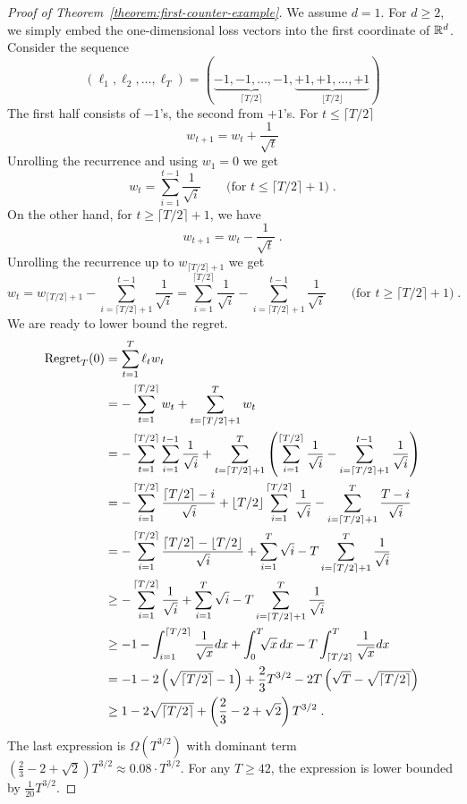 \begin{proof}[Proof of Theorem~\ref{theorem:first-counter-example}]
We assume $d=1$. For $d \ge 2$, we simply embed the one-dimensional loss
vectors into the first coordinate of $\mathbb{R}^d$.  Consider the sequence
$$
(\ell_1, \ell_2, \dots, \ell_T) = \left( \underbrace{- 1, -1, \dots, -1}_{\lceil T/2 \rceil}, \underbrace{+1, +1, \dots, +1}_{\lfloor T/2 \rfloor} \right)
$$
The first half consists of $-1$'s, the second from $+1$'s. For $t \le \lceil T/2 \rceil$
$$
w_{t+1} = w_t + \frac{1}{\sqrt{t}}
$$
Unrolling the recurrence and using $w_1 = 0$ we get
$$
w_t = \sum_{i=1}^{t-1} \frac{1}{\sqrt{i}} \qquad \text{(for $t \le \lceil T/2 \rceil + 1$)} \; .
$$
On the other hand, for $t \ge \lceil T/2 \rceil + 1$, we have
$$
w_{t+1} = w_t - \frac{1}{\sqrt{t}} \; .
$$
Unrolling the recurrence up to $w_{\lceil T/2 \rceil + 1}$ we get
$$
w_t = w_{\lceil T/2 \rceil + 1} - \sum_{i=\lceil T/2 \rceil + 1}^{t-1} \frac{1}{\sqrt{i}}
= \sum_{i=1}^{\lceil T/2 \rceil} \frac{1}{\sqrt{i}} - \sum_{i=\lceil T/2 \rceil + 1}^{t-1} \frac{1}{\sqrt{i}} \qquad \text{(for $t \ge \lceil T/2 \rceil + 1$)} \; .
$$
We are ready to lower bound the regret.
\begin{align*}
\operatorname{Regret}_T(0)
& = \sum_{t=1}^T \ell_t w_t \\
& = - \sum_{t=1}^{\lceil T/2 \rceil} w_t + \sum_{t=\lceil T/2 \rceil + 1}^T w_t  \\
& = - \sum_{t=1}^{\lceil T/2 \rceil} \sum_{i=1}^{t-1} \frac{1}{\sqrt{i}} + \sum_{t=\lceil T/2 \rceil + 1}^T \left( \sum_{i=1}^{\lceil T/2 \rceil} \frac{1}{\sqrt{i}} - \sum_{i=\lceil T/2 \rceil + 1}^{t-1} \frac{1}{\sqrt{i}} \right) \\
& = - \sum_{i=1}^{\lceil T/2 \rceil} \frac{\lceil T/2 \rceil - i}{\sqrt{i}} + \lfloor T/2 \rfloor \sum_{i=1}^{\lceil T/2 \rceil} \frac{1}{\sqrt{i}} - \sum_{i=\lceil T/2 \rceil + 1}^T \frac{T - i}{\sqrt{i}} \\
& = - \sum_{i=1}^{\lceil T/2 \rceil} \frac{\lceil T/2 \rceil - \lfloor T/2 \rfloor}{\sqrt{i}} + \sum_{i=1}^{T} \sqrt{i} - T \sum_{i=\lceil T/2 \rceil + 1}^T \frac{1}{\sqrt{i}} \\
& \ge - \sum_{i=1}^{\lceil T/2 \rceil} \frac{1}{\sqrt{i}} + \sum_{i=1}^{T} \sqrt{i} - T \sum_{i=\lceil T/2 \rceil + 1}^T \frac{1}{\sqrt{i}} \\
& \ge - 1 - \int_{i=1}^{\lceil T/2 \rceil} \frac{1}{\sqrt{x}} dx + \int_{0}^T \!\!\! \sqrt{x} \, dx - T \int_{\lceil T/2 \rceil}^T \frac{1}{\sqrt{x}} dx \\
& = - 1 - 2\left(\sqrt{\lceil T/2 \rceil} - 1 \right) + \frac{2}{3} T^{3/2} - 2 T \left(\sqrt{T} - \sqrt{\lceil T/2 \rceil} \right) \\
& \ge 1 - 2 \sqrt{\lceil T/2 \rceil} + \left( \frac{2}{3} - 2 + \sqrt{2} \right) T^{3/2} \; .
\end{align*}
The last expression is $\Omega(T^{3/2})$ with dominant term $(\frac{2}{3} - 2 +
\sqrt{2}) T^{3/2} \approx 0.08 \cdot T^{3/2}$.  For any $T \ge 42$, the
expression is lower bounded by $\frac{1}{20} T^{3/2}$.
\end{proof}

